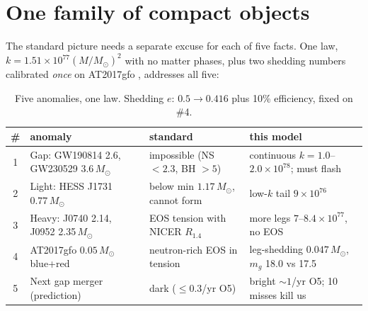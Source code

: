 \documentclass[11pt]{article}
\begin{document}
\section{One family of compact objects}
\label{sec:compact}

The standard picture needs a separate excuse for each of five facts. One law,
$k = 1.51\times 10^{77}(M/M_\odot)^2$ with no matter phases, plus two shedding
numbers calibrated \emph{once} on AT2017gfo \cite{Abbott2017}, addresses all five:

\begin{table}[ht]\centering\footnotesize
\caption{Five anomalies, one law. Shedding $e$: $0.5 \to 0.416$ plus 10\% efficiency, fixed on \#4.}
\label{tab:five}
\begin{tabular}{@{}c p{3.4cm} p{4.2cm} p{6.2cm}@{}}\toprule
\# & anomaly & standard & this model \\\midrule
1 & Gap: GW190814 2.6, GW230529 3.6\,$M_\odot$ & impossible (NS $< 2.3$, BH $> 5$) & continuous $k = 1.0$--$2.0\times 10^{78}$; must flash \\
2 & Light: HESS J1731 $0.77\,M_\odot$ & below min $1.17\,M_\odot$, cannot form & low-$k$ tail $9\times 10^{76}$ \\
3 & Heavy: J0740 2.14, J0952 2.35\,$M_\odot$ & EOS tension with NICER $R_{1.4}$ & more legs $7$--$8.4\times 10^{77}$, no EOS \\
4 & AT2017gfo $0.05\,M_\odot$ blue+red & neutron-rich EOS in tension & leg-shedding $0.047\,M_\odot$, $m_g$ 18.0 vs 17.5 \\
5 & Next gap merger (prediction) & dark ($\le 0.3$/yr O5) & bright $\sim 1$/yr O5; 10 misses kill us \\\bottomrule
\end{tabular}
\end{table}
\end{document}
